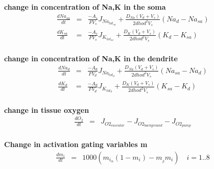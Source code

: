\documentclass[fleqn]{report}
\numberwithin{equation}{section}
\numberwithin{equation}{section}
\begin{document}
\textbf{change in concentration of Na,K in the soma}
\begin{eqnarray}
  \frac{d Na_{sa}}{dt}   &=&  \frac{-A_{s}}{F V_{s}}  J_{Na_{tot_{sa}}} +  \frac{D_{Na} (V_{d} + V_{s})}{2 dhod^2 V_{s}} (Na_{d} - Na_{sa})\\
  \frac{d K_{sa}}{dt}   &=&    \frac{-A_{s}}{F V_{s}}  J_{K_{tot_{sa}}} +  \frac{D_{K} (V_{d} + V_{s})}{2 dhod^2 V_{s}} (K_{d} - K_{sa})\\  
\end{eqnarray}


\textbf{change in concentration of Na,K in the dendrite}
\begin{eqnarray}
  \frac{d Na_{d}}{dt}   &=&  \frac{-A_{d}}{F V_{d}}  J_{Na_{tot_{d}}} +  \frac{D_{Na} (V_{d} + V_{s})}{2 dhod^2 V_{s}} (Na_{sa} - Na_{d})\\
  \frac{d K_{d}}{dt}   &=&    \frac{-A_{d}}{F V_{d}}  J_{K_{tot_{d}}} +  \frac{D_{K} (V_{d} + V_{s})}{2 dhod^2 V_{s}} (K_{sa} - K_{d})\\  
\end{eqnarray}



           
\textbf{ change in tissue oxygen}\begin{eqnarray}
\frac{d O_{2}}{dt}   &=& J_{O2_{vascular}} - J_{O2_{background}} - J_{O2_{pump}}\\
\end{eqnarray}

            


\textbf{ Change in activation gating variables m}
\begin{eqnarray}
\frac{dm_{i}}{dt}    &=& 1000 (m_{i_{\alpha}}  (1 - m_{i}) - m_{_{\beta}} m_{i})\quad i = 1..8\\
\end{eqnarray}
\end{document}

